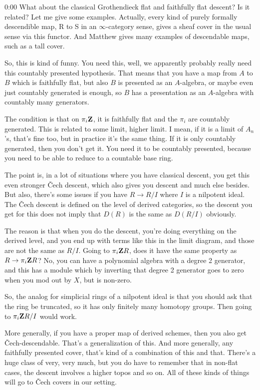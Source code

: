\begin{unfinished}{0:00}
What about the classical Grothendieck flat and faithfully flat descent? Is it related? Let me give some examples. Actually, every kind of purely formally descendible map, R to S in an $\infty$-category sense, gives a sheaf cover in the usual sense via this functor. And Matthew gives many examples of descendable maps, such as a tall cover.

So, this is kind of funny. You need this, well, we apparently probably really need this countably presented hypothesis. That means that you have a map from $A$ to $B$ which is faithfully flat, but also $B$ is presented as an $A$-algebra, or maybe even just countably generated is enough, so $B$ has a presentation as an $A$-algebra with countably many generators.

The condition is that on $\pi_i \mathbf Z$, it is faithfully flat and the $\pi_i$ are countably generated. This is related to some limit, higher limit. I mean, if it is a limit of $A_n$'s, that's fine too, but in practice it's the same thing. If it is only countably generated, then you don't get it. You need it to be countably presented, because you need to be able to reduce to a countable base ring.

The point is, in a lot of situations where you have classical descent, you get this even stronger Čech descent, which also gives you descent and much else besides. But also, there's some issues if you have $R \to R/I$ where $I$ is a nilpotent ideal. The Čech descent is defined on the level of derived categories, so the descent you get for this does not imply that $D(R)$ is the same as $D(R/I)$ obviously.

The reason is that when you do the descent, you're doing everything on the derived level, and you end up with terms like this in the limit diagram, and those are not the same as $R/I$. Going to $\pi_i \mathbf Z R$, does it have the same property as $R \to \pi_i \mathbf Z R$? No, you can have a polynomial algebra with a degree 2 generator, and this has a module which by inverting that degree 2 generator goes to zero when you mod out by $X$, but is non-zero.

So, the analog for simplicial rings of a nilpotent ideal is that you should ask that the ring be truncated, so it has only finitely many homotopy groups. Then going to $\pi_i \mathbf Z R/I$ would work.

More generally, if you have a proper map of derived schemes, then you also get Čech-descendable. That's a generalization of this. And more generally, any faithfully presented cover, that's kind of a combination of this and that. There's a huge class of very, very much, but you do have to remember that in non-flat cases, the descent involves a higher topos and so on. All of these kinds of things will go to Čech covers in our setting.


\end{unfinished}
